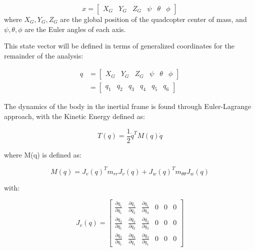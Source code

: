 \documentclass{article}
\begin{document}
\begin{equation}
x=[\begin{array}{cccccc}
X_{G} & Y_{G} & Z_{G} & \psi & \theta & \phi\end{array}]
\end{equation}
where $X_{G},Y_{G},Z_{G}$ are the global position of the quadcopter center of mass, and $\psi,\theta,\phi$ are the Euler angles of each axis.

This state vector will be defined in terms of generalized coordinates for the remainder of the analysis:

\begin{equation}
\begin{split}
q &= [\begin{array}{cccccc}
X_{G} & Y_{G} & Z_{G} & \psi & \theta & \phi\end{array}] \\
&= [\begin{array}{cccccc}
q_{1} & q_{2} & q_{3} & q_{4} & q_{5} & q_{6}\end{array}]
\end{split}
\end{equation}

The dynamics of the body in the inertial frame is found through Euler-Lagrange approach, with the Kinetic Energy defined as:

\begin{equation}
T(q)=\frac{1}{2}\dot{q}^{T}M(q)\dot{q}
\end{equation}

where M(q) is defined as:

\begin{equation}
M(q)=J_{v}(q)^{T}m_{rr}J_{v}(q)+J_{w}(q)^{T}m_{\theta\theta}J_{w}(q)
\end{equation}

with:

\begin{equation}
J_{v}(q)=\left[\begin{array}{cccccc}
\frac{\partial q_{1}}{\partial q_{1}} & \frac{\partial q_{1}}{\partial q_{2}} & \frac{\partial q_{1}}{\partial q_{3}} & 0 & 0 & 0\\
\frac{\partial q_{2}}{\partial q_{1}} & \frac{\partial q_{2}}{\partial q_{2}} & \frac{\partial q_{2}}{\partial q_{3}} & 0 & 0 & 0\\
\frac{\partial q_{3}}{\partial q_{1}} & \frac{\partial q_{3}}{\partial q_{1}} & \frac{\partial q_{3}}{\partial q_{1}} & 0 & 0 & 0
\end{array}\right]
\end{equation}
\end{document}
